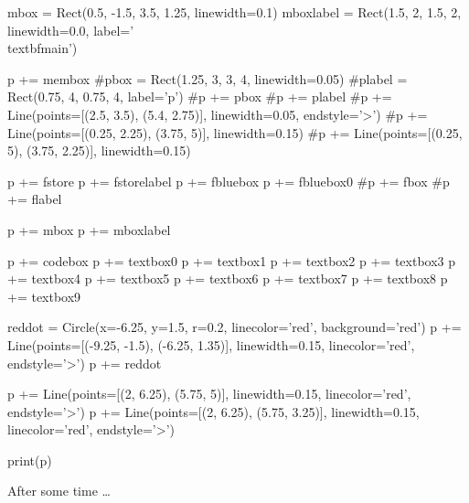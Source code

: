 \begin{python}
mbox = Rect(0.5, -1.5, 3.5, 1.25, linewidth=0.1)
mboxlabel = Rect(1.5, 2, 1.5, 2, linewidth=0.0, label='\\textbf{main}')

p += membox
#pbox = Rect(1.25, 3, 3, 4, linewidth=0.05)
#plabel = Rect(0.75, 4, 0.75, 4, label='p')
#p += pbox
#p += plabel
#p += Line(points=[(2.5, 3.5), (5.4, 2.75)], linewidth=0.05, endstyle='>')
#p += Line(points=[(0.25, 2.25), (3.75, 5)], linewidth=0.15)
#p += Line(points=[(0.25, 5), (3.75, 2.25)], linewidth=0.15)

p += fstore
p += fstorelabel
p += fbluebox
p += fbluebox0
#p += fbox
#p += flabel

p += mbox
p += mboxlabel

p += codebox
p += textbox0
p += textbox1
p += textbox2
p += textbox3
p += textbox4
p += textbox5
p += textbox6
p += textbox7
p += textbox8
p += textbox9

reddot = Circle(x=-6.25, y=1.5, r=0.2, linecolor='red', background='red')
p += Line(points=[(-9.25, -1.5), (-6.25, 1.35)], linewidth=0.15, linecolor='red', endstyle='>')
p += reddot

p += Line(points=[(2, 6.25), (5.75, 5)], linewidth=0.15, linecolor='red', endstyle='>')
p += Line(points=[(2, 6.25), (5.75, 3.25)], linewidth=0.15, linecolor='red', endstyle='>')

print(p)
\end{python}

After some time \ldots


